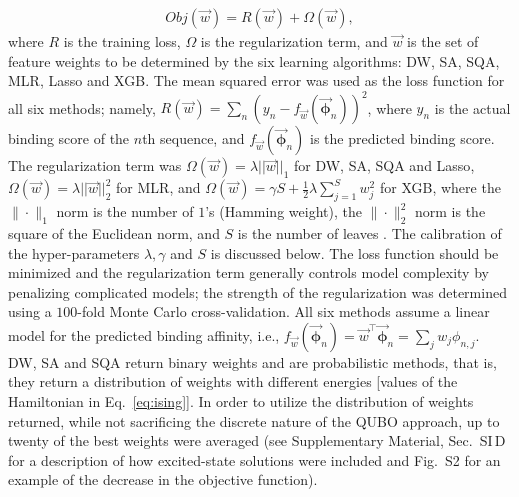 \documentclass[aps,pra,groupedaddress,nofootinbib,notitlepage,showpacs,floatfix,superscriptaddress]{revtex4-1}
\begin{document}
\begin{align}
Obj(\vec{w}) = R(\vec{w})  + \Omega(\vec{w}) \label{eq:Obj},
\end{align}
%
where $R$ is the training loss, $\Omega$ is the regularization term, and $\vec{w}$ is the set of feature weights to be determined by the six learning algorithms: DW, SA, SQA, MLR, Lasso and XGB. The mean squared error was used as the loss function for all six methods; namely, $R(\vec{w}) = \sum_n (y_n- f_{\vec{w}}(\vec{\bm{\phi}}_n))^2$, where $y_n$ is the actual binding score of the $n$th sequence, and $f_{\vec{w}}(\vec{\bm{\phi}}_n)$ is the predicted binding score. {The regularization term was $\Omega(\vec{w}) = \lambda ||\vec{w}||_1$ for DW, SA, SQA and Lasso}, $\Omega(\vec{w}) = \lambda ||\vec{w}||_2^2$ for MLR, and $\Omega(\vec{w}) = \gamma S + \frac{1}{2}\lambda\sum_{j=1}^Sw_j^2$ for XGB, where the $\|\cdot\|_1$ norm is the number of $1$'s (Hamming weight), the $\|\cdot\|_2^2$ norm is the square of the Euclidean norm, and $S$ is the number of leaves \cite{Chen:16}. The calibration of the hyper-parameters $\lambda, \gamma$ and $S$ is discussed below. The loss function should be minimized and the regularization term generally controls model complexity by penalizing complicated models; the strength of the regularization was determined using a $100$-fold Monte Carlo cross-validation. All six methods assume a linear model for the predicted binding affinity, i.e., $f_{\vec{w}}(\vec{\bm{\phi}}_n) = \vec{w}^\intercal \vec{\bm{\phi}}_n = \sum_j w_j\phi_{n,j}$. DW, SA and SQA return binary weights and are probabilistic methods, that is, they return a distribution of weights with different energies [values of the Hamiltonian in Eq.~\eqref{eq:ising}]. In order to utilize the distribution of weights returned, while not sacrificing the discrete nature of the QUBO approach, up to twenty of the best weights were averaged (see Supplementary Material, Sec.~SI\,D for a description of how excited-state solutions were included and Fig.~S2 for an example of the decrease in the objective function).
\end{document}
